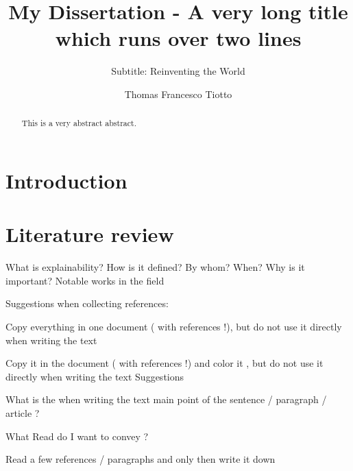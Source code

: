 \documentclass[mscthesis]{usiinfthesis}
\title{My Dissertation - A very long title\\ which runs over two
  lines} %
\subtitle{Subtitle: Reinventing the World} %
\author{Thomas Francesco Tiotto} %
\begin{document}
\maketitle %

\frontmatter %

\begin{abstract}
This is a very abstract abstract. 

\lipsum
\end{abstract}

\begin{acknowledgements}
\lipsum 
\end{acknowledgements}

\tableofcontents 
\listoffigures %
\listoftables %

\mainmatter


\chapter{Introduction}\label{chap:introduction}




 



\chapter{Literature review}\label{chap:literaturereview}
What is explainability?
How is it defined?  By whom?  When?
Why is it important?
Notable works in the field

Suggestions  when  collecting  references:

Copy  everything  in  one  document  (  with  references  !),  but  do  not  use it  directly  when  writing  the  text 
 
Copy it in  the  document  (  with  references  !)  and  color it  ,  but  do  not  use it  directly  when  writing  the  text  Suggestions 

What  is  the  when  writing  the  text  main  point  of  the  sentence  /  paragraph  /  article  ?  

What  Read  do I  want  to  convey  ?  

Read a  few  references  /  paragraphs  and  only  then  write  it  down

\end{document}
